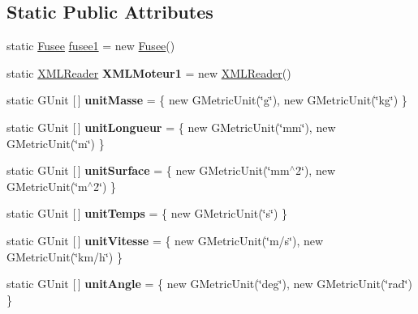 \subsection*{Static Public Attributes}
\begin{DoxyCompactItemize}
\item 
static \mbox{\hyperlink{classpackage_i_h_m_1_1_fusee}{Fusee}} \mbox{\hyperlink{classpackage_i_h_m_1_1_i_h_m_principale_a0259c90c422f8e2265817915fe17ff0b}{fusee1}} = new \mbox{\hyperlink{classpackage_i_h_m_1_1_fusee}{Fusee}}()
\item 
\mbox{\label{classpackage_i_h_m_1_1_i_h_m_principale_ab31aec209a49e6ff78751ee79e846f7d}} 
static \mbox{\hyperlink{classpackage_i_h_m_1_1_x_m_l_reader}{X\+M\+L\+Reader}} {\bfseries X\+M\+L\+Moteur1} = new \mbox{\hyperlink{classpackage_i_h_m_1_1_x_m_l_reader}{X\+M\+L\+Reader}}()
\item 
\mbox{\label{classpackage_i_h_m_1_1_i_h_m_principale_ae10a87b6e0b39c48c52f84d60a1475b9}} 
static G\+Unit \mbox{[}$\,$\mbox{]} {\bfseries unit\+Masse} = \{ new G\+Metric\+Unit(\char`\"{}g\char`\"{}), new G\+Metric\+Unit(\char`\"{}kg\char`\"{}) \}
\item 
\mbox{\label{classpackage_i_h_m_1_1_i_h_m_principale_ae825e6f36872fd60f61a5971999b72c7}} 
static G\+Unit \mbox{[}$\,$\mbox{]} {\bfseries unit\+Longueur} = \{ new G\+Metric\+Unit(\char`\"{}mm\char`\"{}), new G\+Metric\+Unit(\char`\"{}m\char`\"{}) \}
\item 
\mbox{\label{classpackage_i_h_m_1_1_i_h_m_principale_a95956d653b722c0fcdd1716f65eaf628}} 
static G\+Unit \mbox{[}$\,$\mbox{]} {\bfseries unit\+Surface} = \{ new G\+Metric\+Unit(\char`\"{}mm$^\wedge$2\char`\"{}), new G\+Metric\+Unit(\char`\"{}m$^\wedge$2\char`\"{}) \}
\item 
\mbox{\label{classpackage_i_h_m_1_1_i_h_m_principale_a57848424b16e3e56867e0a48128b5f89}} 
static G\+Unit \mbox{[}$\,$\mbox{]} {\bfseries unit\+Temps} = \{ new G\+Metric\+Unit(\char`\"{}s\char`\"{}) \}
\item 
\mbox{\label{classpackage_i_h_m_1_1_i_h_m_principale_a0164a6d53c6f60b72363a8a9b960ee38}} 
static G\+Unit \mbox{[}$\,$\mbox{]} {\bfseries unit\+Vitesse} = \{ new G\+Metric\+Unit(\char`\"{}m/s\char`\"{}), new G\+Metric\+Unit(\char`\"{}km/h\char`\"{}) \}
\item 
\mbox{\label{classpackage_i_h_m_1_1_i_h_m_principale_ae7cfd10927b86f97e0ccaa305dc5d9e2}} 
static G\+Unit \mbox{[}$\,$\mbox{]} {\bfseries unit\+Angle} = \{ new G\+Metric\+Unit(\char`\"{}deg\char`\"{}), new G\+Metric\+Unit(\char`\"{}rad\char`\"{}) \}
\end{DoxyCompactItemize}


